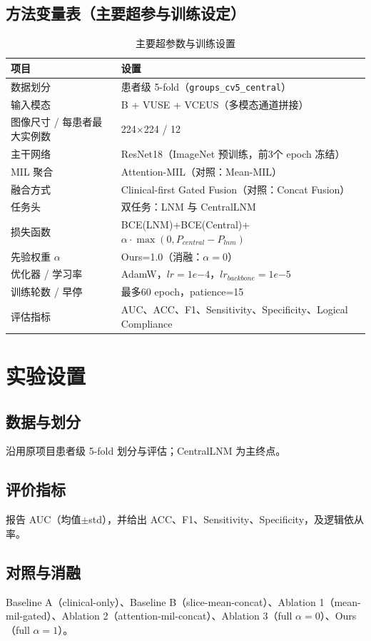 \documentclass[12pt,a4paper]{ctexart}
\begin{document}
\subsection{方法变量表（主要超参与训练设定）}
\begin{table}[H]
\centering
\caption{主要超参数与训练设置}
\begin{tabular}{p{}p{}}
\toprule
项目 & 设置 \\
\midrule
数据划分 & 患者级 5-fold（\texttt{groups\_cv5\_central}） \\
输入模态 & B + VUSE + VCEUS（多模态通道拼接） \\
图像尺寸 / 每患者最大实例数 & 224$\times$224 / 12 \\
主干网络 & ResNet18（ImageNet 预训练，前3个 epoch 冻结） \\
MIL 聚合 & Attention-MIL（对照：Mean-MIL） \\
融合方式 & Clinical-first Gated Fusion（对照：Concat Fusion） \\
任务头 & 双任务：LNM 与 CentralLNM \\
损失函数 & BCE(LNM)+BCE(Central)+$\alpha\cdot\max(0,P_{central}-P_{lnm})$ \\
先验权重 $\alpha$ & Ours=1.0（消融：$\alpha=0$） \\
优化器 / 学习率 & AdamW，$lr=1e{-4}$，$lr_{backbone}=1e{-5}$ \\
训练轮数 / 早停 & 最多60 epoch，patience=15 \\
评估指标 & AUC、ACC、F1、Sensitivity、Specificity、Logical Compliance \\
\bottomrule
\end{tabular}
\end{table}

\section{实验设置}
\subsection{数据与划分}
沿用原项目患者级 5-fold 划分与评估；CentralLNM 为主终点。
\subsection{评价指标}
报告 AUC（均值$\pm$std），并给出 ACC、F1、Sensitivity、Specificity，及逻辑依从率。
\subsection{对照与消融}
Baseline A（clinical-only）、Baseline B（slice-mean-concat）、Ablation 1（mean-mil-gated）、Ablation 2（attention-mil-concat）、Ablation 3（full $\alpha=0$）、Ours（full $\alpha=1$）。
\end{document}
